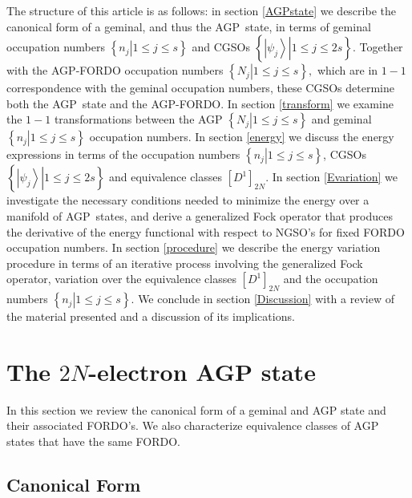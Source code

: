 \documentclass[aps,preprint]{revtex4}%
\begin{document}
The structure of this article is as follows: in section \ref{AGPstate} we
describe the canonical form of a geminal, and thus the AGP\ state, in terms of
geminal occupation numbers $\left\{  \left.  n_{j}\right\vert 1\leq j\leq
s\right\}  $ and CGSOs $\left\{  \left.  \left\vert \psi_{j}\right\rangle
\right\vert 1\leq j\leq2s\right\}  .$ Together with the AGP-FORDO occupation
numbers $\left\{  \left.  N_{j}\right\vert 1\leq j\leq s\right\}  ,$ which are
in $1-1$ correspondence with the geminal occupation numbers, these CGSOs
determine both the AGP\ state and the AGP-FORDO. In section \ref{transform} we
examine the $1-1$ transformations between the AGP $\left\{  \left.
N_{j}\right\vert 1\leq j\leq s\right\}  $ and geminal $\left\{  \left.
n_{j}\right\vert 1\leq j\leq s\right\}  $ occupation numbers. In section
\ref{energy} we discuss the energy expressions in terms of the occupation
numbers $\left\{  \left.  n_{j}\right\vert 1\leq j\leq s\right\}  $, CGSOs
$\left\{  \left.  \left\vert \psi_{j}\right\rangle \right\vert 1\leq
j\leq2s\right\}  $ and equivalence classes $\left[  D^{1}\right]  _{2N}.$ In
section \ref{Evariation} we investigate the necessary conditions needed to
minimize the energy over a manifold of AGP\ states, and derive a generalized
Fock operator that produces the derivative of the energy functional with
respect to NGSO's for fixed FORDO occupation numbers. In section
\ref{procedure} we describe the energy variation procedure in terms of an
iterative process involving the generalized Fock operator, variation over the
equivalence classes $\left[  D^{1}\right]  _{2N}$ and the occupation numbers
$\left\{  \left.  n_{j}\right\vert 1\leq j\leq s\right\}  .$ We conclude in
section \ref{Discussion} with a review of the material presented and a
discussion of its implications.

\section{The $2N$-electron AGP state\label{AGPstate}}

In this section we review the canonical form of a geminal and AGP state and
their associated FORDO's. We also characterize equivalence classes of AGP
states that have the same FORDO.

\subsection{Canonical Form}
\end{document}
